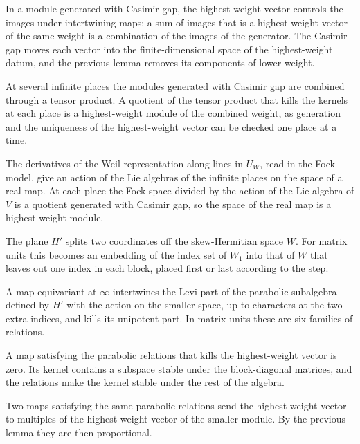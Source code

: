 In a module generated with Casimir gap, the highest-weight vector controls the
images under intertwining maps: a sum of images that is a highest-weight vector
of the same weight is a combination of the images of the generator. The Casimir
gap moves each vector into the finite-dimensional space of the highest-weight
datum, and the previous lemma removes its components of lower weight.

At several infinite places the modules generated with Casimir gap are combined
through a tensor product. A quotient of the tensor product that kills the
kernels at each place is a highest-weight module of the combined weight, as
generation and the uniqueness of the highest-weight vector can be checked one
place at a time.

The derivatives of the Weil representation along lines in $U_W$, read in the
Fock model, give an action of the Lie algebras of the infinite places on the
space of a real map. At each place the Fock space divided by the action of the
Lie algebra of $V$ is a quotient generated with Casimir gap, so the space of the
real map is a highest-weight module.

The plane $H'$ splits two coordinates off the skew-Hermitian space $W$. For
matrix units this becomes an embedding of the index set of $W_1$ into that of
$W$ that leaves out one index in each block, placed first or last according to
the step.

A map equivariant at $\infty$ intertwines the Levi part of the parabolic
subalgebra defined by $H'$ with the action on the smaller space, up to
characters at the two extra indices, and kills its unipotent part. In matrix
units these are six families of relations.

A map satisfying the parabolic relations that kills the highest-weight vector
is zero. Its kernel contains a subspace stable under the block-diagonal
matrices, and the relations make the kernel stable under the rest of the
algebra.

Two maps satisfying the same parabolic relations send the highest-weight vector
to multiples of the highest-weight vector of the smaller module. By the
previous lemma they are then proportional.

